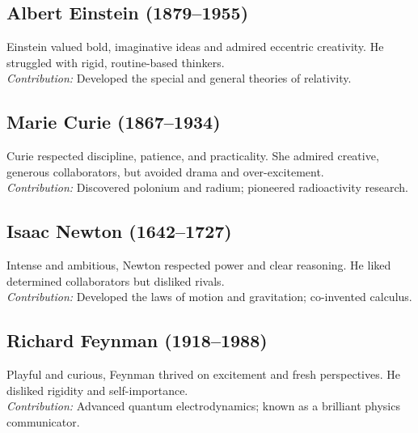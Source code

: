 \documentclass[11pt,a4paper]{article}
\begin{document}
\subsection*{Albert Einstein (1879--1955)}
Einstein valued bold, imaginative ideas and admired eccentric creativity. He
struggled with rigid, routine-based thinkers.\\
\emph{Contribution:} Developed the special and general theories of relativity.

\subsection*{Marie Curie (1867--1934)}
Curie respected discipline, patience, and practicality. She admired
creative, generous collaborators, but avoided drama and over-excitement.\\
\emph{Contribution:} Discovered polonium and radium; pioneered radioactivity
research.

\subsection*{Isaac Newton (1642--1727)}
Intense and ambitious, Newton respected power and clear reasoning. He liked
determined collaborators but disliked rivals.\\
\emph{Contribution:} Developed the laws of motion and gravitation;
co-invented calculus.

\subsection*{Richard Feynman (1918--1988)}
Playful and curious, Feynman thrived on excitement and fresh perspectives. He
disliked rigidity and self-importance.\\
\emph{Contribution:} Advanced quantum electrodynamics; known as a brilliant
physics communicator.
\end{document}

